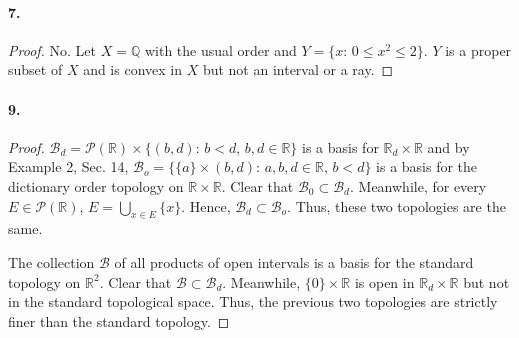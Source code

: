   \paragraph{7.}
  \begin{proof}
    No. Let $X=\mathbb{Q}$ with the usual order and $Y=\{x:\, 0\le x^2\le 2\}$.
    $Y$ is a proper subset of $X$ and is convex in $X$ but not an interval or a
    ray.
  \end{proof}
  
  \paragraph{9.}
  \begin{proof}
    $\mathcal{B}_d=\mathcal{P}(\mathbb{R})\times\{(b,d):\, b<d,\,b,d\in
    \mathbb{R}\}$ is a basis for $\mathbb{R}_d\times\mathbb{R}$ and by Example
    2, Sec. 14, $\mathcal{B}_o=\{\{a\}\times(b,d):\, a,b,d\in\mathbb{R},\,
    b<d\}$ is a basis for the dictionary order topology on $\mathbb{R}\times
    \mathbb{R}$. Clear that $\mathcal{B}_0\subset\mathcal{B}_d$. Meanwhile, for
    every $E\in\mathcal{P}(\mathbb{R})$, $E=\bigcup_{x\in E}\{x\}$. Hence, 
    $\mathcal{B}_d\subset\mathcal{B}_o$. Thus, these two topologies are the 
    same.\par
    The collection $\mathcal{B}$ of all products of open intervals is a basis
    for the standard topology on $\mathbb{R}^2$. Clear that $\mathcal{B}\subset
    \mathcal{B}_d$. Meanwhile, $\{0\}\times\mathbb{R}$ is open in $\mathbb{R}_d
    \times\mathbb{R}$ but not in the standard topological space. Thus, the 
    previous two topologies are strictly finer than the standard topology.
  \end{proof}
  
